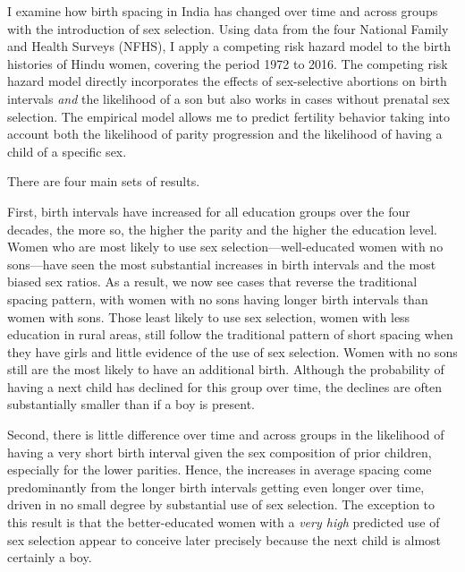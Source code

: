 \documentclass[12pt,letterpaper]{article}
\begin{document}

I examine how birth spacing in India has changed over time and across 
groups with the introduction of sex selection.
Using data from the four National Family and Health Surveys (NFHS), I apply
a competing risk hazard model to the birth histories of Hindu women, covering
the period 1972 to 2016.
The competing risk hazard model directly incorporates the effects of 
sex-selective abortions on birth intervals
\emph{and} 
the likelihood of a son 
but also works in cases without prenatal sex selection.
The empirical model allows me to predict fertility behavior taking into
account both the likelihood of parity progression and the likelihood of having a child of 
a specific sex.

 

There are four main sets of results.

First, birth intervals have increased for all education groups over the four decades, 
the more so, the higher the parity and the higher the education level.
Women who are most likely to use sex selection---well-educated women with no
sons---have seen the most substantial increases in birth intervals and the most 
biased sex ratios.
As a result, we now see cases that reverse the traditional spacing
pattern, with women with no sons having longer birth intervals than
women with sons.
Those least likely to use sex selection, women with less education in rural areas, 
still follow the traditional pattern of short spacing when they have girls and 
little evidence of the use of sex selection.
Women with no sons still are the most likely to have an additional birth.
Although the probability of having a next child has declined for this group over time, the 
declines are often substantially smaller than if a boy is present.

Second, there is little difference over time and across groups in the likelihood of 
having a very short birth interval given the sex composition of prior children, 
especially for the lower parities.
Hence, the increases in average spacing come predominantly from the longer birth intervals
getting even longer over time, driven in no small degree by substantial use of sex 
selection.
The exception to this result is that the better-educated women with a \emph{very high} 
predicted use of sex selection appear to conceive later precisely because the next child 
is almost certainly a boy.
\end{document}
